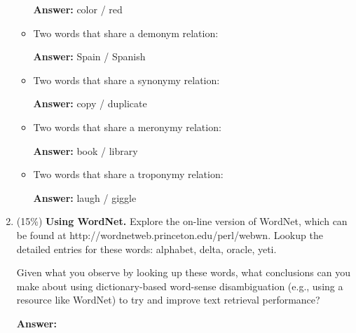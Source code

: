 \documentclass[11pt]{article}
\begin{document}
\begin{enumerate}
\begin{itemize}
                        \textbf{Answer:} color / red

                  \item Two words that share a demonym relation:

                        \textbf{Answer:} Spain / Spanish

                  \item Two words that share a synonymy relation:

                        \textbf{Answer:} copy / duplicate

                  \item Two words that share a meronymy relation:

                        \textbf{Answer:} book / library

                  \item Two words that share a troponymy relation:

                        \textbf{Answer:} laugh / giggle

            \end{itemize}

      \item (15\%) \textbf{Using WordNet.} Explore the on-line version of WordNet, which can be found at http://wordnetweb.princeton.edu/perl/webwn. Lookup the detailed entries for these words: alphabet, delta, oracle, yeti.

            Given what you observe by looking up these words, what conclusions can you make about using dictionary-based word-sense disambiguation (e.g., using a resource like WordNet) to try and improve text retrieval performance?

            \textbf{Answer:}


\end{enumerate}
\end{document}

